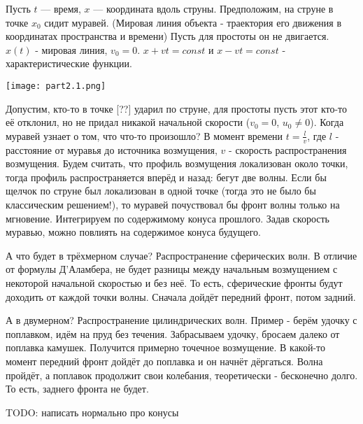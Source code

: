 \begin{example}
Пусть $t$ --- время, $x$ --- координата вдоль струны. Предположим, на струне в точке $x_0$ сидит муравей. (Мировая линия объекта - траектория его движения в координатах пространства и времени) Пусть для простоты он не двигается. $x(t)$ - мировая линия, $v_0 = 0$. $x + vt = const$ и $x -vt = const$ - характеристические функции.

\texttt{[image: part2.1.png]}

Допустим, кто-то в точке [??] ударил по струне, для простоты пусть этот кто-то её отклонил, но не придал никакой начальной скорости ($v_0 = 0$, $u_0 \neq 0$). Когда муравей узнает о том, что что-то произошло? В момент времени $ t = \frac {l} {v}$, где $l$ - расстояние от муравья до источника возмущения, $v$ - скорость распространения возмущения. Будем считать, что профиль возмущения локализован около точки, тогда профиль распространяется вперёд и назад: бегут две волны. Если бы щелчок по струне был локализован в одной точке (тогда это не было бы классическим решением!), то муравей почуствовал бы фронт волны только на мгновение.
Интегрируем по содержимому конуса прошлого. Задав скорость муравью, можно повлиять на содержимое конуса будущего.
\end{example}

{\small А что будет в трёхмерном случае? Распространение сферических волн. В отличие от формулы Д'Аламбера, не будет разницы между начальным возмущением с некоторой начальной скоростью и без неё. То есть, сферические фронты будут доходить от каждой точки волны. Сначала дойдёт передний фронт, потом задний.

А в двумерном? Распространение цилиндрических волн. Пример - берём удочку с поплавком, идём на пруд без течения. Забрасываем удочку, бросаем далеко от поплавка камушек. Получится примерно точечное возмущение. В какой-то момент передний фронт дойдёт до поплавка и он начнёт дёргаться. Волна пройдёт, а поплавок продолжит свои колебания, теоретически - бесконечно долго. То есть, заднего фронта не будет.}

TODO: написать нормально про конусы

